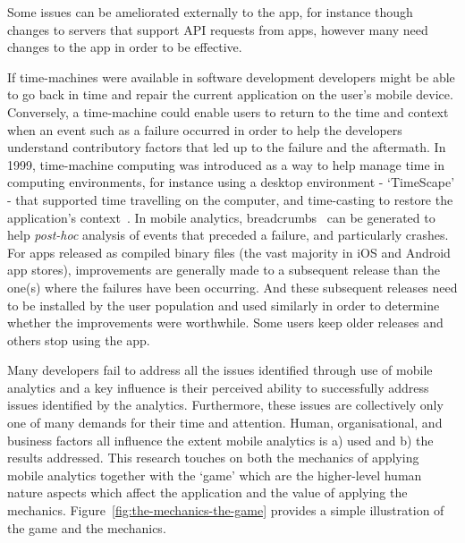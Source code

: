 Some issues can be ameliorated externally to the app, for instance though changes to servers that support API requests from apps, however many need changes to the app in order to be effective. 

If time-machines were available in software development developers might be able to go back in time and repair the current application on the user's mobile device. Conversely, a time-machine could enable users to return to the time and context when an event such as a failure occurred in order to help the developers understand contributory factors that led up to the failure and the aftermath. In 1999, time-machine computing was introduced as a way to help manage time in computing environments, for instance using a desktop environment - `TimeScape' - that supported time travelling on the computer, and time-casting to restore the application's context~\citep{rekimoto1999_time_machine_computing}. In mobile analytics, breadcrumbs~\citep{MacLean2015_pro_android_5_book} can be generated to help \emph{post-hoc} analysis of events that preceded a failure, and particularly crashes. 
%
For apps released as compiled binary files (the vast majority in iOS and Android app stores), improvements are generally made to a subsequent release than the one(s) where the failures have been occurring. And these subsequent releases need to be installed by the user population and used similarly in order to determine whether the improvements were worthwhile. Some users keep older releases and others stop using the app. 




Many developers fail to address all the issues identified through use of mobile analytics and a key influence is their perceived ability to successfully address issues identified by the analytics. Furthermore, these issues are collectively only one of many demands for their time and attention. Human, organisational, and business factors all influence the extent mobile analytics is a) used and b) the results addressed. This research touches on both the mechanics of applying mobile analytics together with the `game' which are the higher-level human nature aspects which affect the application and the value of applying the mechanics. Figure~\ref{fig:the-mechanics-the-game} provides a simple illustration of the game and the mechanics.

